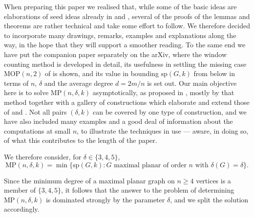 \documentclass[12pt,a4paper]{article}%
\begin{document}
When preparing this paper we realised that, while some of the basic ideas are elaborations of seed ideas
already in \cite{CaroLauriZarb} and \cite{CaroWest}, several of the proofs of the lemmas and theorems are
rather technical and take some effort to follow. We therefore decided to incorporate many drawings, remarks,
examples and explanations along the way, in the hope that they will support a smoother reading. To the same
end we have put the companion paper \cite{P1} separately on the arXiv, where the window counting method is
developed in detail, its usefulness in settling the missing case $\mathrm{MOP}(n,2)$ of \cite{CaroLauriZarb}
is shown, and its value in bounding $\mathrm{sp}(G,k)$ from below in terms of $n$, $\delta $ and the average
degree $d=2m/n$ is set out. Our main objective here is to solve $\mathrm{MP}(n,\delta ,k)$ asymptotically,
as proposed in \cite{CaroLauriZarb}, mostly by that method together with a gallery of constructions which
elaborate and extend those of \cite{CaroLauriZarb} and \cite{CaroWest}. Not all pairs $(\delta ,k)$ can be
covered by one type of construction, and we have also included many examples and a good deal of information
about the computations at small $n$, to illustrate the techniques in use --- aware, in doing so, of what this
contributes to the length of the paper.



We therefore consider, for $\delta \in \{3,4,5\}$,
\[
\mathrm{MP}(n,\delta ,k)=\min \{\mathrm{sp}(G,k):G\text{ maximal planar of order }n\text{ with }\delta (G)=\delta \}.
\]


Since the minimum degree of a maximal planar graph on $n\geq 4$ vertices is a member of $\{3,4,5\}$, it follows
that the answer to the problem of determining $\mathrm{MP}(n,\delta ,k)$ is dominated strongly by the
parameter $\delta $, and we split the solution accordingly.
\end{document}
